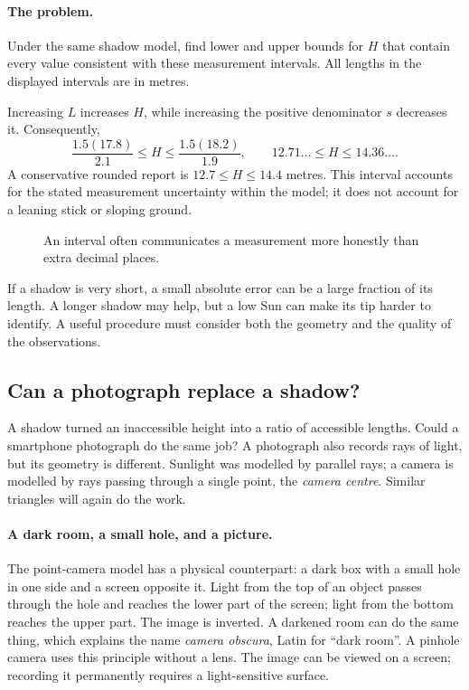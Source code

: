 \paragraph{The problem.}
Under the same shadow model, find lower and upper bounds for $H$ that
contain every value consistent with these measurement intervals. All
lengths in the displayed intervals are in metres.

Increasing $L$ increases $H$, while increasing the positive denominator
$s$ decreases it. Consequently,
\[
\frac{1.5(17.8)}{2.1}\leq H\leq\frac{1.5(18.2)}{1.9},
\qquad 12.71\ldots\leq H\leq14.36\ldots.
\]
A conservative rounded report is $12.7\leq H\leq14.4$ metres.
This interval accounts for the stated measurement uncertainty within the
model; it does not account for a leaning stick or sloping ground.

\begin{figure}[htbp]\centering
{}
\caption{An interval often communicates a measurement more honestly than extra decimal places.}
\end{figure}

If a shadow is very short, a small absolute error can be a large fraction
of its length. A longer shadow may help, but a low Sun can make its tip
harder to identify. A useful procedure must consider both the geometry
and the quality of the observations.

\subsection{Can a photograph replace a shadow?}
\label{sec:geo-camera}
A shadow turned an inaccessible height into a ratio of accessible lengths.
Could a smartphone photograph do the same job? A photograph also records
rays of light, but its geometry is different. Sunlight was modelled by
parallel rays; a camera is modelled by rays passing through a single point,
the \emph{camera centre}. Similar triangles will again do the work.

\paragraph{A dark room, a small hole, and a picture.}
The point-camera model has a physical counterpart: a dark box with a small
hole in one side and a screen opposite it. Light from the top of an object
passes through the hole and reaches the lower part of the screen; light
from the bottom reaches the upper part. The image is inverted. A darkened
room can do the same thing, which explains the name \emph{camera obscura},
Latin for ``dark room''. A pinhole camera uses this principle without a
lens. The image can be viewed on a screen; recording it permanently
requires a light-sensitive surface.

